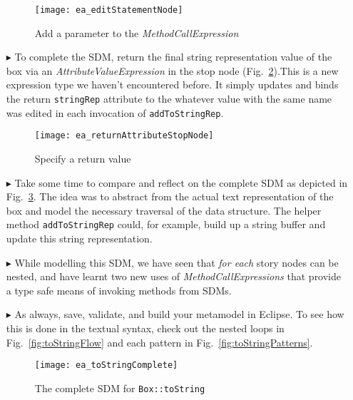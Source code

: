 \begin{itemize}
\begin{figure}[htbp]
\begin{center}
  \texttt{[image: ea\_editStatementNode]}
  \caption{Add a parameter to the \emph{MethodCallExpression}}
  \label{fig:editStatement}
\end{center}
\end{figure}

\item[$\blacktriangleright$] To complete the SDM, return the final string representation value of the box via an \emph{AttributeValueExpression} in
the stop node (Fig.~\ref{fig:toStringStopNode}).This is a new expression type we haven't encountered before. It simply
updates and binds the return \texttt{stringRep} attribute to the whatever value with the same name was edited in each invocation of
\texttt{add\-To\-String\-Rep}.

\newpage

\begin{figure}[htbp]
\begin{center}
  \texttt{[image: ea\_returnAttributeStopNode]}
  \caption{Specify a return value}
  \label{fig:toStringStopNode}
\end{center}
\end{figure}

\vspace{0.5cm}

\item[$\blacktriangleright$] Take some time to compare and reflect on the complete SDM as depicted in Fig.~\ref{fig:sdm_tostring_5}.  The idea was to abstract
from the actual text representation of the box and model the necessary traversal of the data structure. The helper method \texttt{addToStringRep} could, for
example, build up a string buffer and update this string representation. 

\vspace{0.5cm}

\item[$\blacktriangleright$] While modelling this SDM, we have seen that \emph{for each} story nodes can be nested, and have learnt two new uses of
\emph{MethodCallExpressions} that provide a type safe means of invoking methods from SDMs.

\vspace{0.5cm}

\item[$\blacktriangleright$] As always, save, validate, and build your metamodel in Eclipse. To see how this is done in the
textual syntax, check out the nested loops in Fig.~\ref{fig:toStringFlow} and each pattern in Fig.~\ref{fig:toStringPatterns}.

\newpage

\vspace*{2cm}

\begin{figure}[htbp]
\begin{center}
  \texttt{[image: ea\_toStringComplete]}
  \caption{The complete SDM for \texttt{Box::toString}}  
  \label{fig:sdm_tostring_5}
\end{center}
\end{figure}
\FloatBarrier


\end{itemize}
